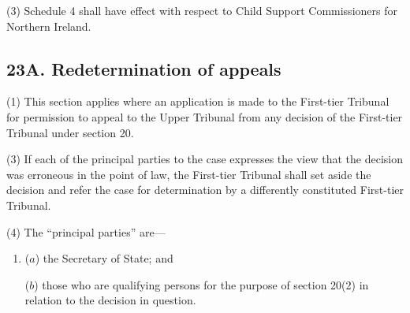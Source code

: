 \documentclass[12pt,a4paper]{article}
\begin{document}
(3)
Schedule 4 shall have effect with respect to Child Support Commissioners for Northern Ireland.

%


\subsection{23A. Redetermination of appeals}

(1) This section applies where an application is made to the First-tier Tribunal for permission to appeal to the Upper Tribunal from any decision of the First-tier Tribunal under section 20.

(3) If each of the principal parties to the case expresses the view that the decision was erroneous in the point of law, the First-tier Tribunal shall set aside the decision and refer the case for determination by a differently constituted First-tier Tribunal.

(4) The “principal parties” are---
\begin{enumerate}\item[]
($a$) the Secretary of State; and

($b$) those who are qualifying persons for the purpose of section 20(2) in relation
to the decision in question.
\end{enumerate}
\end{document}
